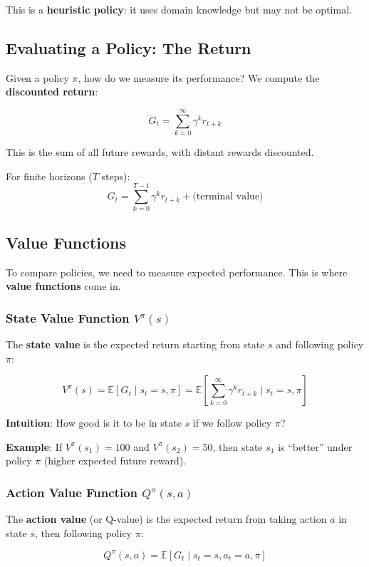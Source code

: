 \documentclass[12pt,a4paper]{article}
\begin{document}
This is a \textbf{heuristic policy}: it uses domain knowledge but may not be optimal.

\subsection{Evaluating a Policy: The Return}

Given a policy $\pi$, how do we measure its performance? We compute the \textbf{discounted return}:

\[
G_t = \sum_{k=0}^{\infty} \gamma^k r_{t+k}
\]

This is the sum of all future rewards, with distant rewards discounted.

For finite horizons ($T$ steps):
\[
G_t = \sum_{k=0}^{T-1} \gamma^k r_{t+k} + \text{(terminal value)}
\]

\subsection{Value Functions}

To compare policies, we need to measure expected performance. This is where \textbf{value functions} come in.

\subsubsection{State Value Function $V^{\pi}(s)$}

The \textbf{state value} is the expected return starting from state $s$ and following policy $\pi$:

\[
V^{\pi}(s) = \mathbb{E}\left[ G_t \mid s_t = s, \pi \right] = \mathbb{E}\left[ \sum_{k=0}^{\infty} \gamma^k r_{t+k} \mid s_t = s, \pi \right]
\]

\textbf{Intuition}: How good is it to be in state $s$ if we follow policy $\pi$?

\textbf{Example}: If $V^{\pi}(s_1) = 100$ and $V^{\pi}(s_2) = 50$, then state $s_1$ is ``better'' under policy $\pi$ (higher expected future reward).

\subsubsection{Action Value Function $Q^{\pi}(s, a)$}

The \textbf{action value} (or Q-value) is the expected return from taking action $a$ in state $s$, then following policy $\pi$:

\[
Q^{\pi}(s, a) = \mathbb{E}\left[ G_t \mid s_t = s, a_t = a, \pi \right]
\]
\end{document}
